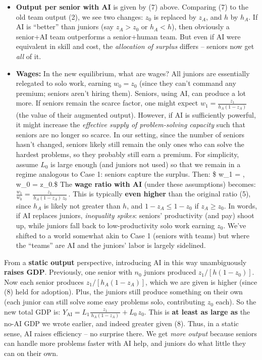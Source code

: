 \documentclass[12pt]{article}
\begin{document}
\begin{itemize}
\tightlist
\item
  \textbf{Output per senior with AI} is given by (7) above. Comparing
  (7) to the old team output (2), we see two changes: \(z_0\) is
  replaced by \(z_A\), and \(h\) by \(h_A\). If AI is ``better'' than
  juniors (say \(z_A > z_0\) or \(h_A < h\)), then obviously a senior+AI
  team outperforms a senior+human team. But even if AI were equivalent
  in skill and cost, the \emph{allocation of surplus} differs -- seniors
  now get \emph{all} of it.
\item
  \textbf{Wages:} In the new equilibrium, what are wages? All juniors
  are essentially relegated to solo work, earning \(w_0 = z_0\) (since
  they can't command any premium; seniors aren't hiring them). Seniors,
  using AI, can produce a lot more. If seniors remain the scarce factor,
  one might expect \(w_1 = \frac{z_1}{h_A(1-z_A)}\) (the value of their
  augmented output). However, if AI is sufficiently powerful, it might
  increase the \emph{effective supply of problem-solving capacity} such
  that seniors are no longer so scarce. In our setting, since the number
  of seniors hasn't changed, seniors likely still remain the only ones
  who can solve the hardest problems, so they probably still earn a
  premium. For simplicity, assume \(L_0\) is large enough (and juniors
  not used) so that we remain in a regime analogous to Case 1: seniors
  capture the surplus. Then: \$ w\_1 = ,
  \qquad w\_0 = z\_0.\$ The \textbf{wage ratio with AI} (under these
  assumptions) becomes:
  \(\frac{w_1}{w_0} = \frac{z_1}{\,h_A (1-z_A) \, z_0}\,.\) This is
  typically \textbf{even higher} than the original ratio (5), since
  \(h_A\) is likely not greater than \(h\), and \(1-z_A \le 1-z_0\) if
  \(z_A \ge z_0\). In words, if AI replaces juniors, \emph{inequality
  spikes}: seniors' productivity (and pay) shoot up, while juniors fall
  back to low-productivity solo work earning \(z_0\). We've shifted to a
  world somewhat akin to Case 1 (seniors with teams) but where the
  ``teams'' are AI and the juniors' labor is largely sidelined.
\end{itemize}

From a \textbf{static output} perspective, introducing AI in this way
unambiguously \textbf{raises GDP}. Previously, one senior with \(n_0\)
juniors produced \(z_1/[h(1-z_0)]\). Now each senior produces
\(z_1/[h_A(1-z_A)]\), which we are given is higher (since (8) held for
adoption). Plus, the juniors still produce something on their own (each
junior can still solve some easy problems solo, contributing \(z_0\)
each). So the new total GDP is:
\(Y_{\text{AI}} = L_1 \frac{z_1}{\,h_A(1-z_A)\,} + L_0 \, z_0.\) This is
\textbf{at least as large as} the no-AI GDP we wrote earlier, and indeed
greater given (8). Thus, in a static sense, AI raises efficiency -- no
surprise there. We get \emph{more output} because seniors can handle
more problems faster with AI help, and juniors do what little they can
on their own.
\end{document}
